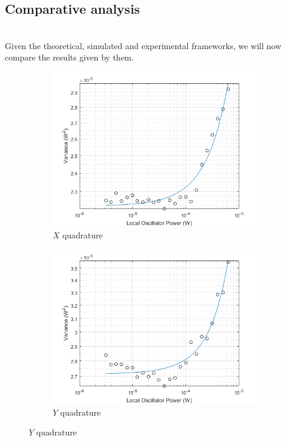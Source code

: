 \begin{bibunit}[plain]
\subsection{Comparative analysis}
%
\\
Given the theoretical, simulated and experimental frameworks, we will now compare the results given by them.
\\
%
\begin{figure}[H]
	\begin{subfigure}{.5\textwidth}
		\centering
		\includegraphics[width=.8\linewidth]{./sdf/optical_detection/figures/noise_exp_channel1.png}
		\caption{$X$ quadrature}
		\label{fig:noise-exp-1}
	\end{subfigure}%
	\begin{subfigure}{.5\textwidth}
		\centering
		\includegraphics[width=.8\linewidth]{./sdf/optical_detection/figures/noise_exp_channel3.png}
		\caption{$Y$ quadrature}
		\label{fig:noise-exp-3}
	\end{subfigure}

\end{figure}
\end{bibunit}
